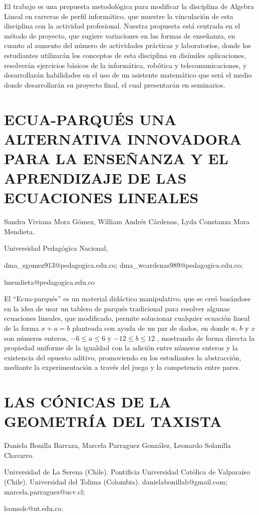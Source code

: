 El trabajo es una propuesta metodológica para modificar la disciplina
de Algebra Lineal en carreras de perfil informático, que muestre la
vinculación de esta disciplina con la actividad profesional. Nuestra
propuesta está centrada en el método de proyecto, que sugiere variaciones
en las formas de enseñanza, en cuanto al aumento del número de actividades
prácticas y laboratorios, donde los estudiantes utilizarán los conceptos
de esta disciplina en disímiles aplicaciones, resolverán ejercicios
básicos de la informática, robótica y telecomunicaciones, y desarrollarán
habilidades en el uso de un asistente matemático que será el medio
donde desarrollarán su proyecto final, el cual presentarán en seminarios. 


\section{ECUA-PARQUÉS UNA ALTERNATIVA INNOVADORA PARA LA ENSEÑANZA Y EL APRENDIZAJE
DE LAS ECUACIONES LINEALES}

\begin{datos}

Sandra Viviana Mora Gómez, William Andrés Cárdenas, Lyda Constanza
Mora Mendieta.

Universidad Pedagógica Nacional,

dma\_sgomez913@pedagogica.edu.co; dma\_wcardenas989@pedagogica.edu.co;

lmendieta@pedagogica.edu.co

\end{datos}

El “Ecua-parqués” es un material didáctico manipulativo, que se creó
basándose en la idea de usar un tablero de parqués tradicional para
resolver algunas ecuaciones lineales, que modificado, permite solucionar
cualquier ecuación lineal de la forma $x+a=b$ planteada con ayuda
de un par de dados, en donde $a,\text{\,\ensuremath{b}}$ y $x$ son
números enteros, $-6\leq a\leq6$ y $-12\leq b\leq12$ , mostrando
de forma directa la propiedad uniforme de la igualdad con la adición
entre números enteros y la existencia del opuesto aditivo, promoviendo
en los estudiantes la abstracción, mediante la experimentación a través
del juego y la competencia entre pares.


\section{LAS CÓNICAS DE LA GEOMETRÍA DEL TAXISTA }

\begin{datos}

Daniela Bonilla Barraza, Marcela Parraguez González, Leonardo Solanilla
Chavarro.

Universidad de La Serena (Chile). Pontificia Universidad Católica
de Valparaíso (Chile). Universidad del Tolima (Colombia). danielabonillab@gmail.com;
marcela.parraguez@ucv.cl;

leonsolc@ut.edu.co.

\end{datos}

